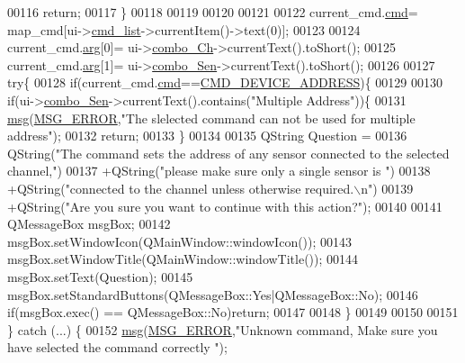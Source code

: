 \begin{DoxyCode}
00116         \textcolor{keywordflow}{return};
00117     \}
00118 
00119 
00120 
00121 
00122     current\_cmd.\hyperlink{a00004_af20664dc9ca2b752c73d524edee0e07a}{cmd}= map\_cmd[ui->\hyperlink{a00080_aa66ece71395b435e915d384fb63bac1d}{cmd\_list}->currentItem()->text(0)];
00123 
00124     current\_cmd.\hyperlink{a00004_a56e6c2d7315d0ae60a51e8b140c9cfe4}{arg}[0]= ui->\hyperlink{a00080_a263fb43f2eff37a44ff7359ba41e2eeb}{combo\_Ch}->currentText().toShort();
00125     current\_cmd.\hyperlink{a00004_a56e6c2d7315d0ae60a51e8b140c9cfe4}{arg}[1]= ui->\hyperlink{a00080_ad95005b5fcac8126171019298147b285}{combo\_Sen}->currentText().toShort();
00126 
00127     \textcolor{keywordflow}{try}\{
00128        \textcolor{keywordflow}{if}(current\_cmd.\hyperlink{a00004_af20664dc9ca2b752c73d524edee0e07a}{cmd}==\hyperlink{a00086_a7c6a5f4023cb02d02f2ded23147be425}{CMD\_DEVICE\_ADDRESS})\{
00129 
00130            \textcolor{keywordflow}{if}(ui->\hyperlink{a00080_ad95005b5fcac8126171019298147b285}{combo\_Sen}->currentText().contains(\textcolor{stringliteral}{"Multiple Address"}))\{
00131                \hyperlink{a00017_a6134b74dbfffbaf333e169bd09597b53}{msg}(\hyperlink{a00090_aa8a990825a5a62c89d2fb8b08d8a1070}{MSG\_ERROR},\textcolor{stringliteral}{"The slelected command can not be used for multiple address"});
00132                \textcolor{keywordflow}{return};
00133            \}
00134 
00135            QString Question =
00136                    QString(\textcolor{stringliteral}{"The command sets the address of any sensor connected to the selected channel,"})
00137                    +QString(\textcolor{stringliteral}{"please make sure only a single sensor is "})
00138                    +QString(\textcolor{stringliteral}{"connected to the channel unless otherwise required.\(\backslash\)n"})
00139                    +QString(\textcolor{stringliteral}{"Are you sure you want to continue with this action?"});
00140 
00141            QMessageBox msgBox;
00142            msgBox.setWindowIcon(QMainWindow::windowIcon());
00143            msgBox.setWindowTitle(QMainWindow::windowTitle());
00144            msgBox.setText(Question);
00145            msgBox.setStandardButtons(QMessageBox::Yes|QMessageBox::No);
00146            \textcolor{keywordflow}{if}(msgBox.exec() == QMessageBox::No)\textcolor{keywordflow}{return};
00147 
00148        \}
00149 
00150 
00151    \} \textcolor{keywordflow}{catch} (...) \{
00152         \hyperlink{a00017_a6134b74dbfffbaf333e169bd09597b53}{msg}(\hyperlink{a00090_aa8a990825a5a62c89d2fb8b08d8a1070}{MSG\_ERROR},\textcolor{stringliteral}{"Unknown command, Make sure you have selected the command correctly "});

\end{DoxyCode}
